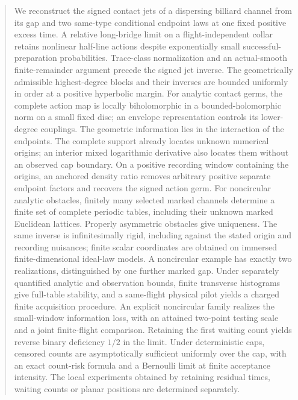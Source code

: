\begin{abstract}
We reconstruct the signed contact jets of a dispersing billiard channel
from its gap and two same-type conditional endpoint laws at one fixed
positive excess time.  A relative long-bridge limit on a flight-independent
collar retains nonlinear half-line actions despite exponentially small
successful-preparation probabilities.  Trace-class normalization and an
actual-smooth finite-remainder argument precede the signed jet inverse.
The geometrically admissible highest-degree blocks and their inverses
are bounded uniformly in order at a positive hyperbolic margin.
For analytic contact germs, the complete action map is locally
biholomorphic in a bounded-holomorphic norm on a small fixed disc;
an envelope representation controls its lower-degree couplings.
The geometric information lies in the interaction of the endpoints.
The complete support already locates unknown numerical origins; an interior
mixed logarithmic derivative also locates them without an observed cap
boundary.  On a positive recording window containing the origins, an
anchored density ratio removes arbitrary positive separate endpoint factors
and recovers the signed action germ.  For noncircular analytic obstacles, finitely
many selected marked channels determine a finite set of complete periodic
tables, including their unknown marked Euclidean lattices.  Properly
asymmetric obstacles give uniqueness.  The same inverse is infinitesimally
rigid, including against the stated origin and recording nuisances;
finite scalar coordinates are obtained on immersed finite-dimensional
ideal-law models.  A noncircular example has exactly two realizations,
distinguished by one further marked gap.  Under separately quantified
analytic and observation bounds, finite transverse histograms give
full-table stability, and a same-flight physical pilot yields a charged
finite acquisition procedure.  An explicit noncircular family realizes the small-window information
loss, with an attained two-point testing scale and a joint finite-flight
comparison.  Retaining the first waiting count yields reverse binary deficiency
$1/2$ in the limit.  Under deterministic caps, censored counts are
asymptotically sufficient uniformly over the cap, with an exact count-risk
formula and a Bernoulli limit at finite acceptance intensity.
The local experiments obtained by retaining
residual times, waiting counts or planar positions are determined separately.
\end{abstract}
\makeatletter
\def\@setabstracta{%
  \ifvoid\abstractbox\else
    \skip@20\p@ \advance\skip@-\lastskip
    \advance\skip@-\baselineskip \vskip\skip@
    \unvbox\abstractbox \prevdepth\z@
  \fi}
\makeatother
\maketitle
\setcounter{tocdepth}{1}
\tableofcontents


